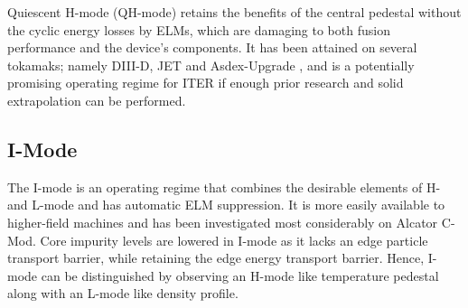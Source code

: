 \documentclass[12pt]{article}  %
\begin{document}
Quiescent H-mode (QH-mode) retains the benefits of the central pedestal without the cyclic energy losses by ELMs, which are damaging to both fusion performance and the device's components. It has been attained on several tokamaks; namely DIII-D, JET and Asdex-Upgrade \cite{Burrell2002, Suttrop2005}, and is a potentially promising operating regime for ITER if enough prior research and solid extrapolation can be performed.


\subsection{I-Mode}
The I-mode is an operating regime that combines the desirable elements of H- and L-mode\cite{Whyte2010} and has automatic ELM suppression.\cite{Marmar2015} It is more easily available to higher-field machines and has been investigated most considerably on Alcator C-Mod. Core impurity levels are lowered in I-mode as it lacks an edge particle transport barrier, while retaining the edge energy transport barrier. Hence, I-mode can be distinguished by observing an H-mode like temperature pedestal along with an L-mode like density profile.\cite{Whyte2010}




\printbibliography
\end{document}
